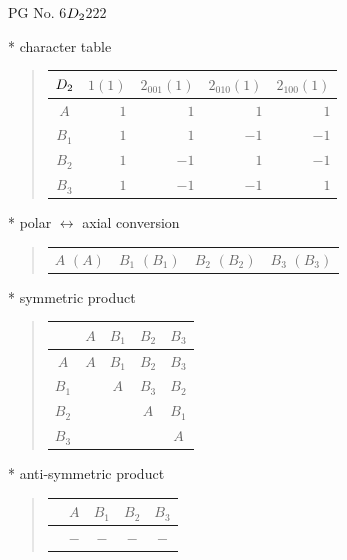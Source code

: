 \documentclass[fleqn,8pt,landscape]{jsarticle}
\begin{document}
\setcounter{MaxMatrixCols}{32}

\renewcommand{\tablename}{Table~}
\renewcommand{\figurename}{Figure~}
\begin{center}
\LARGE
PG No. 6\quad$D_{\rm 2}$\quad$222$\quad[ orthorhombic ]
\end{center}

* character table
\begin{quote}
\begin{tabular}{crrrr} \hline \hline
$ D_{\rm 2} $ & $ 1(1) $ & $ 2{}_{001}(1) $ & $ 2{}_{010}(1) $ & $ 2{}_{100}(1) $ \\ \hline
$ A $ & $ 1 $ & $ 1 $ & $ 1 $ & $ 1 $ \\
$ B_{1} $ & $ 1 $ & $ 1 $ & $ -1 $ & $ -1 $ \\
$ B_{2} $ & $ 1 $ & $ -1 $ & $ 1 $ & $ -1 $ \\
$ B_{3} $ & $ 1 $ & $ -1 $ & $ -1 $ & $ 1 $ \\
 \hline \hline
\end{tabular}
\end{quote}

* polar $\leftrightarrow$ axial conversion
\begin{quote}
\begin{tabular}{cccc}
$ A\,\,(A) $ & $ B_{1}\,\,(B_{1}) $ & $ B_{2}\,\,(B_{2}) $ & $ B_{3}\,\,(B_{3}) $
\end{tabular}
\end{quote}

* symmetric product
\begin{quote}
\begin{tabular}{c|cccc} \hline \hline
 & $ A $ & $ B_{1} $ & $ B_{2} $ & $ B_{3} $ \\ \hline
$ A $ & $ A $ & $ B_{1} $ & $ B_{2} $ & $ B_{3} $ \\
$ B_{1} $ & $  $ & $ A $ & $ B_{3} $ & $ B_{2} $ \\
$ B_{2} $ & $  $ & $  $ & $ A $ & $ B_{1} $ \\
$ B_{3} $ & $  $ & $  $ & $  $ & $ A $ \\
 \hline \hline
\end{tabular}
\end{quote}

* anti-symmetric product
\begin{quote}
\begin{tabular}{ccccc} \hline \hline
 & $ A $ & $ B_{1} $ & $ B_{2} $ & $ B_{3} $ \\ \hline
$  $ & $ - $ & $ - $ & $ - $ & $ - $ \\
 \hline \hline
\end{tabular}
\end{quote}
\end{document}
